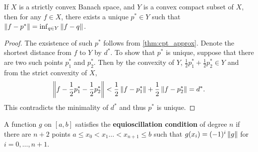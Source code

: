 \begin{theorem}
    If $X$ is a strictly convex Banach space, and $Y$ is a convex compact
    subset of $X$, then for any $f\in X$, there exists a unique $p^*\in Y$ 
    such that $\left\lVert {f-p^*} \right\rVert = \inf_{q\in Y}\left\lVert {f-q} \right\rVert$.
\end{theorem}
\begin{proof}
    The exsistence of such $p^*$ follows from \cref{thm:cpt_approx}. Denote 
    the shortest distance from $f$ to $Y$ by $d^*$. To show that $p^*$ is unique, 
    suppose that there are two such points $p_1^*$ and $p_2^*$. Then by the 
    convexity of $Y$, $\frac{1}{2}p_1^* + \frac{1}{2}p_2^*\in Y$ and from the 
    strict convexity of $X$, 
    \begin{equation*}
        \left\lVert {f - \frac{1}{2}p_1^* - \frac{1}{2}p_2^*} \right\rVert < \frac{1}{2}\left\lVert {f-p_1^*} \right\rVert + \frac{1}{2}\left\lVert {f-p_2^*} \right\rVert = d^*.
    \end{equation*}
    This contradicts the minimality of $d^*$ and thus $p^*$ is unique.
\end{proof}

\begin{definition}
    A function $g$ on $[a,b]$ satisfies the \textbf{equioscillation condition} of 
    degree $n$ if there are $n+2$ points $a\leq x_0 < x_1 \ldots< x_{n+1}\leq b$ 
    such that $g(x_i) = (-1)^i\left\lVert {g} \right\rVert$ for $i = 0,\ldots,n+1$.
\end{definition}

